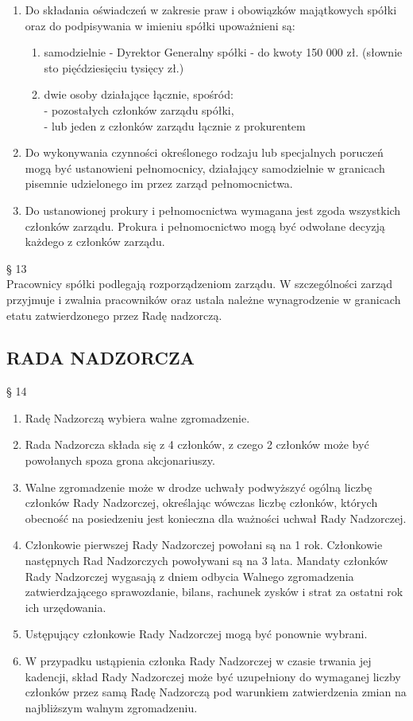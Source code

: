 \documentclass[a4paper, 11pt]{article}
\begin{document}
\begin{enumerate}
\item	Do składania oświadczeń w zakresie praw i obowiązków majątkowych spółki oraz do podpisywania w imieniu spółki upoważnieni są:
\begin{enumerate}
\item	samodzielnie - Dyrektor Generalny spółki - do kwoty 150 000 zł. (słownie sto pięćdziesięciu tysięcy zł.)
\item	dwie osoby działające łącznie, spośród:\\
- pozostałych członków zarządu spółki,\\
- lub jeden z członków zarządu łącznie z prokurentem\\
\end{enumerate}

\item	Do wykonywania czynności określonego rodzaju lub specjalnych poruczeń mogą być ustanowieni pełnomocnicy, działający samodzielnie w granicach pisemnie udzielonego im przez zarząd pełnomocnictwa.
\item	Do ustanowionej prokury i pełnomocnictwa wymagana jest zgoda wszystkich członków zarządu. Prokura i pełnomocnictwo mogą być odwołane decyzją każdego z członków zarządu.
\end{enumerate}


§ 13\\
Pracownicy spółki podlegają rozporządzeniom zarządu. W szczególności zarząd przyjmuje i zwalnia pracowników oraz ustala należne wynagrodzenie w granicach etatu zatwierdzonego przez Radę nadzorczą.

\subsection{RADA NADZORCZA}

§ 14\\
\begin{enumerate}
\item	Radę Nadzorczą wybiera walne zgromadzenie.
\item	Rada Nadzorcza składa się z 4 członków, z czego 2 członków może być powołanych spoza grona akcjonariuszy.
\item	Walne zgromadzenie może w drodze uchwały podwyższyć ogólną liczbę członków Rady Nadzorczej, określając wówczas liczbę członków, których obecność na posiedzeniu jest konieczna dla ważności uchwał Rady Nadzorczej.
\item	Członkowie pierwszej Rady Nadzorczej powołani są na 1 rok. Członkowie następnych Rad Nadzorczych powoływani są na 3 lata. Mandaty członków Rady Nadzorczej wygasają z dniem odbycia Walnego zgromadzenia zatwierdzającego sprawozdanie, bilans, rachunek zysków i strat za ostatni rok ich urzędowania.
\item	Ustępujący członkowie Rady Nadzorczej mogą być ponownie wybrani.
\item	W przypadku ustąpienia członka Rady Nadzorczej w czasie trwania jej kadencji, skład Rady Nadzorczej może być uzupełniony do wymaganej liczby członków przez samą Radę Nadzorczą pod warunkiem zatwierdzenia zmian na najbliższym walnym zgromadzeniu.

\end{enumerate}
\end{document}
